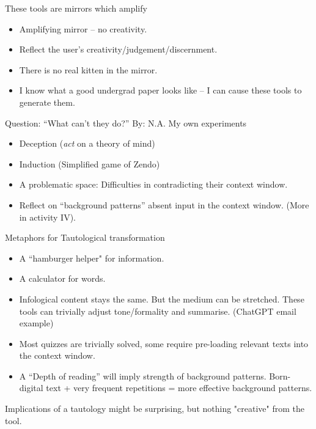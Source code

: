 \documentclass[aspectratio=169]{beamer}
\newcommand{\clearbackground}[0]{\setbeamertemplate{background}{}}
\begin{document}
\clearbackground{}
\begin{frame}{These tools are mirrors which amplify}


\begin{itemize}
    \item Amplifying mirror -- no creativity.
    \item Reflect the user's creativity/judgement/discernment.
    \item There is no real kitten in the mirror.
    \item I know what a good undergrad paper looks like -- I can cause these tools to generate them.
\end{itemize}

     
\end{frame}
\begin{frame}{Question: ``What can't they do?'' By: N.A.}
My own experiments
  \begin{itemize}
      \item Deception (\textit{act} on a theory of mind)
      \item Induction (Simplified game of Zendo)
      \item A problematic space: Difficulties in contradicting their context window.
      \item Reflect on ``background patterns'' absent input in the context window. (More in activity IV). 
  \end{itemize}


\end{frame}
\begin{frame}{Metaphors for Tautological transformation}
\begin{itemize}
    \item A ``hamburger helper" for information. 
    \item A calculator for words. \parencite{Willison2023-nf}
    \item Infological content stays the same. But the medium can be stretched. These tools can trivially adjust tone/formality and summarise. (ChatGPT email example)
    \item Most quizzes are trivially solved, some require pre-loading relevant texts into the context window.
    \item A ``Depth of reading'' will imply strength of background patterns. Born-digital text + very frequent repetitions = more effective background patterns.
\end{itemize}

\vspace{1em}

{\Large Implications of a tautology might be surprising, but nothing "creative" from the tool.}
    
\end{frame}
\end{document}
